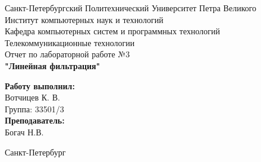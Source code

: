 \documentclass[a4paper]{article}
\begin{document}

\begin{titlepage}	%

	\begin{center}		%

		\large Санкт-Петербургский Политехнический Университет Петра Великого\\
		\large Институт компьютерных наук и технологий \\
		\large Кафедра компьютерных систем и программных технологий\\[6cm]
		
		\huge Телекоммуникационные технологии\\[0.5cm] %
		\large Отчет по лабораторной работе №3 \\[0.2cm]
		\large\textbf{"Линейная фильтрация"}\\[5cm]

	\end{center}


	\begin{flushright} %
		\begin{minipage}{0.25\textwidth} %
			\begin{flushleft} %

				\large\textbf{Работу выполнил:}\\
				\large Вотчицев К. В.\\
				\large {Группа:} 33501/3\\
				
				\large \textbf{Преподаватель:}\\
				\large Богач Н.В.\

			\end{flushleft}
		\end{minipage}
	\end{flushright}
	
	\vfill %

	\begin{center}
	\large Санкт-Петербург\\
	\large \the\year %
	\end{center} %

\thispagestyle{empty} %
\end{titlepage} %
\end{document}
